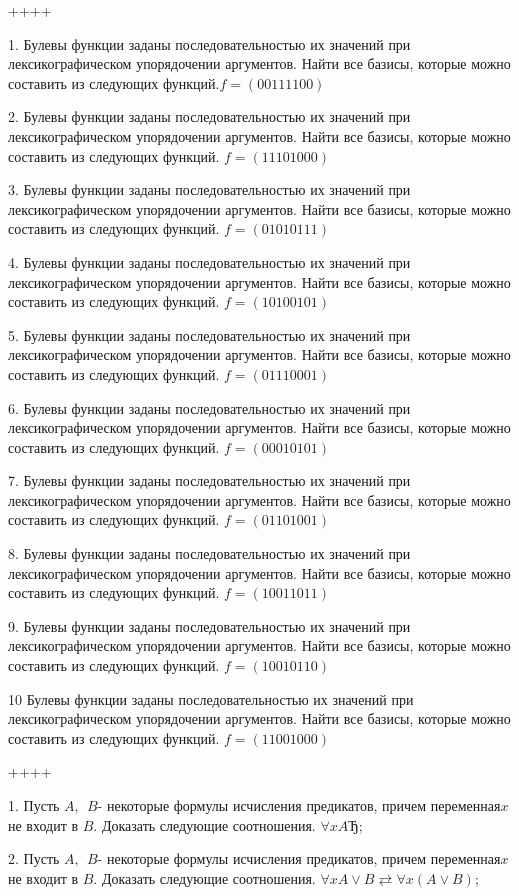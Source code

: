 ++++

1. Булевы функции заданы последовательностью их значений при лексикографическом упорядочении аргументов. Найти все базисы, которые можно составить из следующих функций.\(f = (00111100)\)

2. Булевы функции заданы последовательностью их значений при лексикографическом упорядочении аргументов. Найти все базисы, которые можно составить из следующих функций. \(f = (11101000)\)

3. Булевы функции заданы последовательностью их значений при лексикографическом упорядочении аргументов. Найти все базисы, которые можно составить из следующих функций. \(f = (01010111)\)

4. Булевы функции заданы последовательностью их значений при лексикографическом упорядочении аргументов. Найти все базисы, которые можно составить из следующих функций. \(f = (10100101)\)

5. Булевы функции заданы последовательностью их значений при лексикографическом упорядочении аргументов. Найти все базисы, которые можно составить из следующих функций. \(f = (01110001)\)

6. Булевы функции заданы последовательностью их значений при лексикографическом упорядочении аргументов. Найти все базисы, которые можно составить из следующих функций. \(f = (00010101)\)

7. Булевы функции заданы последовательностью их значений при лексикографическом упорядочении аргументов. Найти все базисы, которые можно составить из следующих функций. \(f = (01101001)\)

8. Булевы функции заданы последовательностью их значений при лексикографическом упорядочении аргументов. Найти все базисы, которые можно составить из следующих функций. \(f = (10011011)\)

9. Булевы функции заданы последовательностью их значений при лексикографическом упорядочении аргументов. Найти все базисы, которые можно составить из следующих функций. \(f = (10010110)\)

10 Булевы функции заданы последовательностью их значений при лексикографическом упорядочении аргументов. Найти все базисы, которые можно составить из следующих функций. \(f = (11001000)\)

++++

1. Пусть \(A,\ \ B\)- некоторые формулы исчисления предикатов, причем переменная\(x\) не входит в \(B\). Доказать следующие соотношения. \(\forall xAЂ\);

2. Пусть \(A,\ \ B\)- некоторые формулы исчисления предикатов, причем переменная\(x\) не входит в \(B\). Доказать следующие соотношения. \(\forall xA \vee B \rightleftarrows \forall x(A \vee B)\);

